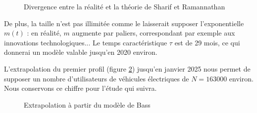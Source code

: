		\begin{figure}[h!]
			\caption{Divergence entre la réalité et la théorie de Sharif et Ramannathan \label{fig.diverSharifRam}}
			\begin{center}
			\end{center}
		\end{figure}
		
		
		De plus, la taille n'est pas illimitée comme le laisserait supposer l'exponentielle $m(t)$ : en réalité, $m$ augmente par paliers, correspondant par exemple aux innovations technologiques... Le temps caractéristique $\tau$ est de 29 mois, ce qui donnerai un modèle valable jusqu'en 2020 environ.
		
		L'extrapolation du premier profil (figure \ref{fig.extraBass}) jusqu'en janvier 2025 nous permet de supposer un nombre d'utilisateurs de véhicules électriques de $N = 163 000$ environ. Nous conservons ce chiffre pour l'étude qui suivra.
		
		\begin{figure}[h!]
			\caption{Extrapolation à partir du modèle de Bass \label{fig.extraBass}}
			\begin{center}
			\end{center}
		\end{figure}